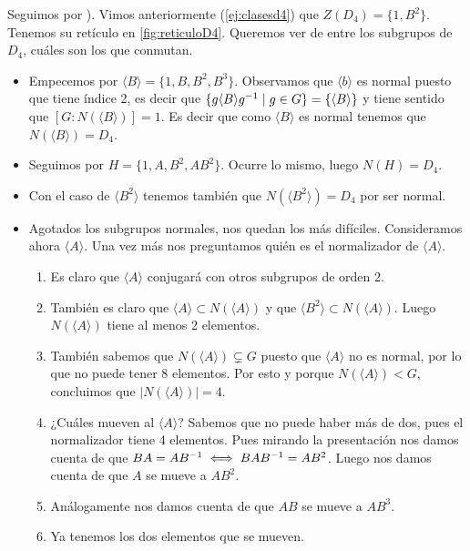 \begin{ej}
	Seguimos por ). Vimos anteriormente (\autoref{ej:clasesd4}) que $Z(D_4) = \{1, B^2\}$. Tenemos su retículo en \autoref{fig:reticuloD4}. Queremos ver de entre los subgrupos de $D_4$, cuáles son los que conmutan.
	\begin{itemize}
		\item Empecemos por $\langle B \rangle = \{1, B, B^2, B^3\}$. Observamos que $\langle b \rangle$ es normal puesto que tiene índice 2, es decir que $\{g\langle B \rangle g^{-1} \mid g \in G\} = \{\langle B \rangle\}$ y tiene sentido que $[G:N(\langle B \rangle)] = 1$. Es decir que como $\langle B \rangle$ es normal tenemos que $N(\langle B \rangle) = D_4$.
		\item Seguimos por $H = \{1, A, B^2, AB^2\}$. Ocurre lo mismo, luego $N(H) = D_4$.
		\item Con el caso de $\langle B^2 \rangle$ tenemos también que $N(\langle B^2 \rangle) = D_4$ por ser normal.
		\item Agotados los subgrupos normales, nos quedan los más difíciles. Consideramos ahora $\langle A \rangle$. Una vez más nos preguntamos quién es el normalizador de $\langle A \rangle$.
		\begin{enumerate}
			\item Es claro que $\langle A \rangle$ conjugará con otros subgrupos de orden 2.
			\item También es claro que $\langle A \rangle \subset N(\langle A \rangle)$ y que $\langle B^2 \rangle \subset N(\langle A \rangle)$. Luego $N(\langle A \rangle)$ tiene al menos 2 elementos.
			\item También sabemos que $N(\langle A \rangle) \subsetneq G$ puesto que $\langle A \rangle$ no es normal, por lo que no puede tener 8 elementos. Por esto y porque $N(\langle A \rangle) < G$, concluimos que $|N(\langle A \rangle)| = 4$.
			\item ¿Cuáles mueven al $\langle A \rangle$? Sabemos que no puede haber más de dos, pues el normalizador tiene 4 elementos. Pues mirando la presentación nos damos cuenta de que $BA = AB^{-1} \iff BAB^{-1} = AB^2$. Luego nos damos cuenta de que $A$ se mueve a $AB^2$.
			\item Análogamente nos damos cuenta de que $AB$ se mueve a $AB^3$.
			\item Ya tenemos los dos elementos que se mueven.
		\end{enumerate}
	\end{itemize}
\end{ej}

